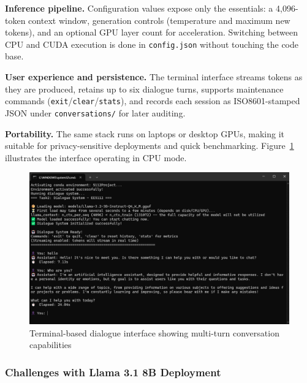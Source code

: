 \documentclass[12pt,a4paper]{article}
\begin{document}
\noindent\textbf{Inference pipeline.} Configuration values expose only the essentials: a 4,096-token context window, generation controls (temperature and maximum new tokens), and an optional GPU layer count for acceleration. Switching between CPU and CUDA execution is done in \texttt{config.json} without touching the code base.

\noindent\textbf{User experience and persistence.} The terminal interface streams tokens as they are produced, retains up to six dialogue turns, supports maintenance commands (\texttt{exit}/\texttt{clear}/\texttt{stats}), and records each session as ISO8601-stamped JSON under \texttt{conversations/} for later auditing.

\noindent\textbf{Portability.} The same stack runs on laptops or desktop GPUs, making it suitable for privacy-sensitive deployments and quick benchmarking. Figure~\ref{fig:llama_cpu_chat} illustrates the interface operating in CPU mode.

\begin{figure}[H]
    \centering
    \includegraphics[width=0.95\linewidth]{Figures/llama对话.png}
    \caption{Terminal-based dialogue interface showing multi-turn conversation capabilities}
    \label{fig:llama_cpu_chat}
\end{figure}


\subsubsection{Challenges with Llama 3.1 8B Deployment}
\end{document}

